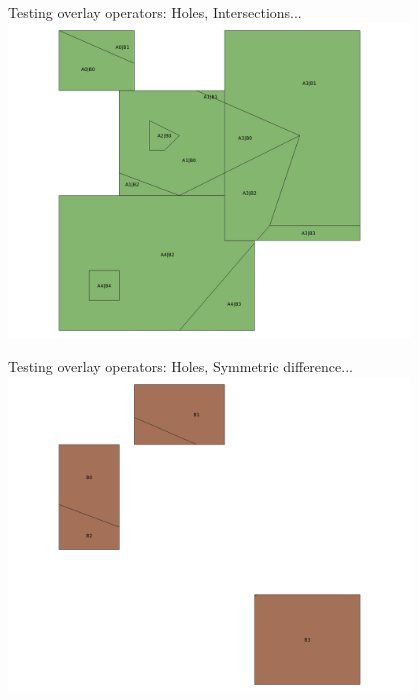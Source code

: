 \documentclass{beamer}
\begin{document}
\begin{frame}{Testing overlay operators: Holes, Intersections...}
    \centering
	\includegraphics[trim=1cm 0 1cm 0, clip, width=0.8\textwidth]{figures/Holes_Intersection}
\end{frame}
\begin{frame}{Testing overlay operators: Holes, Symmetric difference...}
    \centering
	\includegraphics[trim=1cm 0 1cm 0, clip, width=0.8\textwidth]{figures/Holes_Symmetric}
\end{frame}
\end{document}
